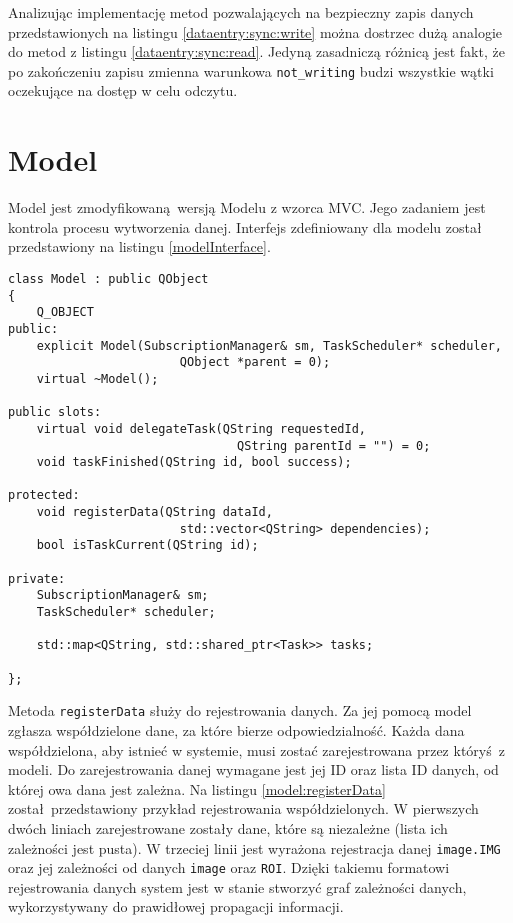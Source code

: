 Analizując implementację metod pozwalających na bezpieczny zapis danych przedstawionych na listingu \ref{dataentry:sync:write} można dostrzec dużą analogie do metod z listingu \ref{dataentry:sync:read}. Jedyną zasadniczą różnicą jest fakt, że po zakończeniu zapisu zmienna warunkowa \lstinline$not_writing$ budzi wszystkie wątki oczekujące na dostęp w celu odczytu.

\section{Model}

Model jest zmodyfikowaną wersją Modelu z wzorca MVC. Jego zadaniem jest kontrola procesu wytworzenia danej. Interfejs zdefiniowany dla modelu został przedstawiony na listingu \ref{modelInterface}.

\begin{minipage}{\textwidth}
	\begin{lstlisting}[label=modelInterface, caption={Interfejs klasy \lstinline$Model$},alsoletter={()[].=}]
class Model : public QObject
{
	Q_OBJECT
public:
	explicit Model(SubscriptionManager& sm, TaskScheduler* scheduler,
						QObject *parent = 0);
	virtual ~Model();

public slots:
	virtual void delegateTask(QString requestedId,
								QString parentId = "") = 0;
	void taskFinished(QString id, bool success);

protected:
	void registerData(QString dataId,
						std::vector<QString> dependencies);
	bool isTaskCurrent(QString id);

private:
	SubscriptionManager& sm;
	TaskScheduler* scheduler;
	
	std::map<QString, std::shared_ptr<Task>> tasks;

};
	\end{lstlisting}
\end{minipage}


Metoda \lstinline$registerData$ służy do rejestrowania danych. Za jej pomocą model zgłasza współdzielone dane, za które bierze odpowiedzialność. Każda dana współdzielona, aby istnieć w systemie, musi zostać zarejestrowana przez któryś z modeli. Do zarejestrowania danej wymagane jest jej ID oraz lista ID danych, od której owa dana jest zależna. Na listingu \ref{model:registerData} został przedstawiony przykład rejestrowania współdzielonych. W pierwszych dwóch liniach zarejestrowane zostały dane, które są niezależne (lista ich zależności jest pusta). W trzeciej linii jest wyrażona rejestracja danej \lstinline$image.IMG$ oraz jej zależności od danych \lstinline$image$ oraz \lstinline$ROI$. Dzięki takiemu formatowi rejestrowania danych system jest w stanie stworzyć graf zależności danych, wykorzystywany do prawidłowej propagacji informacji.

